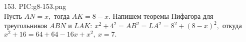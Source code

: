 153. {{PIC:g8-153.png}}\\
Пусть $AN=x,$ тогда $AK=8-x.$ Напишем теоремы Пифагора для треугольников $ABN$ и $LAK:\ x^2+4^2=AB^2=LA^2=8^2+(8-x)^2,$ откуда $x^2+16=64+64-16x+x^2,\ x=7.$\\
